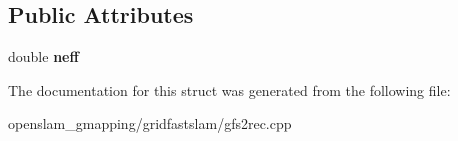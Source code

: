 \subsection*{Public Attributes}
\begin{DoxyCompactItemize}
\item 
\mbox{\label{structNeffRecord_a54acd5634d3a0281e37111979b973bd8}} 
double {\bfseries neff}
\end{DoxyCompactItemize}


The documentation for this struct was generated from the following file\+:\begin{DoxyCompactItemize}
\item 
openslam\+\_\+gmapping/gridfastslam/gfs2rec.\+cpp\end{DoxyCompactItemize}
